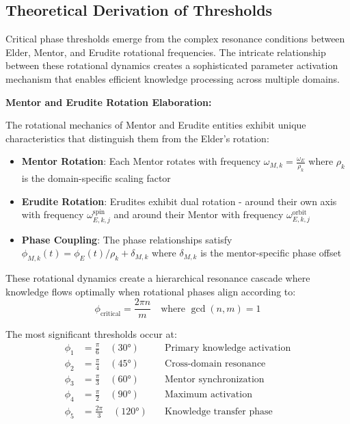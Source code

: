 \subsection{Theoretical Derivation of Thresholds}

Critical phase thresholds emerge from the complex resonance conditions between Elder, Mentor, and Erudite rotational frequencies. The intricate relationship between these rotational dynamics creates a sophisticated parameter activation mechanism that enables efficient knowledge processing across multiple domains.

\textbf{Mentor and Erudite Rotation Elaboration:}

The rotational mechanics of Mentor and Erudite entities exhibit unique characteristics that distinguish them from the Elder's rotation:

\begin{itemize}
    \item \textbf{Mentor Rotation}: Each Mentor rotates with frequency $\omega_{M,k} = \frac{\omega_E}{\rho_k}$ where $\rho_k$ is the domain-specific scaling factor
    \item \textbf{Erudite Rotation}: Erudites exhibit dual rotation - around their own axis with frequency $\omega_{E,k,j}^{\text{spin}}$ and around their Mentor with frequency $\omega_{E,k,j}^{\text{orbit}}$
    \item \textbf{Phase Coupling}: The phase relationships satisfy $\phi_{M,k}(t) = \phi_E(t)/\rho_k + \delta_{M,k}$ where $\delta_{M,k}$ is the mentor-specific phase offset
\end{itemize}

These rotational dynamics create a hierarchical resonance cascade where knowledge flows optimally when rotational phases align according to:
\begin{equation}
\phi_{\text{critical}} = \frac{2\pi n}{m} \quad \text{where } \gcd(n,m) = 1
\end{equation}

The most significant thresholds occur at:
\begin{align}
\phi_1 &= \frac{\pi}{6} \quad (30°) \quad &\text{Primary knowledge activation} \\
\phi_2 &= \frac{\pi}{4} \quad (45°) \quad &\text{Cross-domain resonance} \\
\phi_3 &= \frac{\pi}{3} \quad (60°) \quad &\text{Mentor synchronization} \\
\phi_4 &= \frac{\pi}{2} \quad (90°) \quad &\text{Maximum activation} \\
\phi_5 &= \frac{2\pi}{3} \quad (120°) \quad &\text{Knowledge transfer phase}
\end{align}

